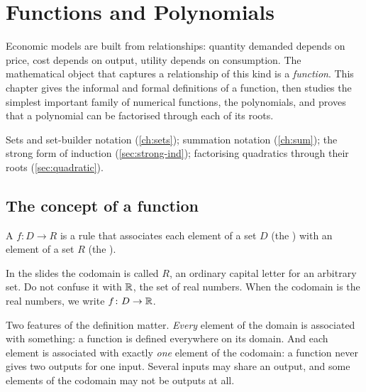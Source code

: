 \chapter{Functions and Polynomials}\label{ch:func}

\begin{chapterintro}
Economic models are built from relationships: quantity demanded depends on price, cost depends on output, utility
depends on consumption. The mathematical object that captures a relationship of this kind is a \emph{function}. This
chapter gives the informal and formal definitions of a function, then studies the simplest important family of numerical
functions, the polynomials, and proves that a polynomial can be factorised through each of its roots.
\end{chapterintro}

\begin{prerequisites}
Sets and set-builder notation (\cref{ch:sets}); summation notation (\cref{ch:sum}); the strong form of induction
(\cref{sec:strong-ind}); factorising quadratics through their roots (\cref{sec:quadratic}).
\end{prerequisites}

\section{The concept of a function}\label{sec:function}

\begin{definition}
A  $f\colon D\to R$ is a rule that associates each element of a set $D$ (the ) with an
element of a set $R$ (the ). 
\end{definition}

\begin{note}[Notation]
In the slides the codomain is called $R$, an ordinary capital letter for an arbitrary set. Do not confuse it with $\mathbb{R}$,
the set of real numbers. When the codomain is the real numbers, we write $f\colon D\to\mathbb{R}$.
\end{note}

Two features of the definition matter. \emph{Every} element of the domain is associated with something: a function is
defined everywhere on its domain. And each element is associated with exactly \emph{one} element of the codomain: a
function never gives two outputs for one input. Several inputs may share an output, and some elements of the codomain may
not be outputs at all.

